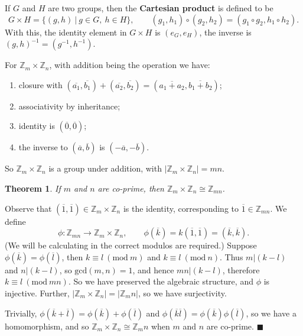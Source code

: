 \documentclass[letter-paper]{tufte-book}
\newtheorem{theorem}{\color{pastel-blue}Theorem}[section]
\newenvironment{proof}[1][Proof]{\begin{trivlist}
\item[\hskip \labelsep {\bfseries #1}]}{\end{trivlist}}
\newenvironment{example}[1][Example]{\begin{trivlist}
\item[\hskip \labelsep {\bfseries #1}]}{\end{trivlist}}
\newcommand\Def[1]{\textbf{#1}}
\newcommand{\qed}{\hfill$\blacksquare$}
\begin{document}
If $G$ and $H$ are two groups, then the \Def{Cartesian product} is defined
to be
\begin{equation*}
  G\times H=\{(g,h)\ |\ g\in G,\ h\in H\},\qquad
  (g_1,h_1)\circ(g_2,h_2)=(g_1 \circ g_2, h_1 \circ h_2).
\end{equation*}
With this, the identity element in $G\times H$ is $(e_G, e_H)$, the inverse is
$(g,h)^{-1}=(g^{-1}, h^{-1})$.
\begin{example}
  For $\mathbb{Z}_m\times\mathbb{Z}_n$, with addition being the operation we
  have:
  \begin{enumerate}
    \item closure with $(\overline{a_1},\overline{b_1})+
    (\overline{a_2},\overline{b_2})=(\overline{a_1+a_2},\overline{b_1+b_2})$;
    \item associativity by inheritance;
    \item identity is $(\overline{0},\overline{0})$;
    \item the inverse to $(\overline{a},\overline{b})$ is
    $(-\overline{a},-\overline{b})$.
  \end{enumerate}
  So $\mathbb{Z}_m\times\mathbb{Z}_n$ is a group under addition, with
  $|\mathbb{Z}_m\times\mathbb{Z}_n|=mn$.
\end{example}

\begin{theorem}
  If $m$ and $n$ are co-prime, then $\mathbb{Z}_m\times\mathbb{Z}_n
  \cong\mathbb{Z}_{mn}$.
\end{theorem}
\begin{proof}
  Observe that $(\overline{1},\overline{1})\in\mathbb{Z}_m\times\mathbb{Z}_n$ is
  the identity, corresponding to $\overline{1}\in\mathbb{Z}_{mn}$. We define
  \begin{equation*}
    \phi:\mathbb{Z}_{mn}\rightarrow\mathbb{Z}_m\times\mathbb{Z}_n,\qquad
    \phi(\overline{k})=k(\overline{1},\overline{1})=(\overline{k},\overline{k}).
  \end{equation*}
  (We will be calculating in the correct modulos are required.) Suppose
  $\phi(\overline{k})=\phi(\overline{l})$, then $k\equiv l\ (\mbox{mod}\ m)$ and
  $k\equiv l\ (\mbox{mod}\ n)$. Thus $m|(k-l)$ and $n|(k-l)$, so
  $\mbox{gcd}(m,n)=1$, and hence $mn|(k-l)$, therefore $k\equiv l\ (\mbox{mod}\
  mn)$. So we have preserved the algebraic structure, and $\phi$ is injective.
  Further, $|\mathbb{Z}_m\times\mathbb{Z}_n|=|\mathbb{Z}_mn|$, so we have
  surjectivity.
  
  Trivially, $\phi(\overline{k}+\overline{l})=
  \phi(\overline{k})+\phi(\overline{l})$ and
  $\phi(\overline{k}\overline{l})=\phi(\overline{k})\phi(\overline{l})$, so we
  have a homomorphism, and so $\mathbb{Z}_m\times\mathbb{Z}_n
  \cong\mathbb{Z}_mn$ when $m$ and $n$ are co-prime. \qed
\end{proof}
\end{document}
